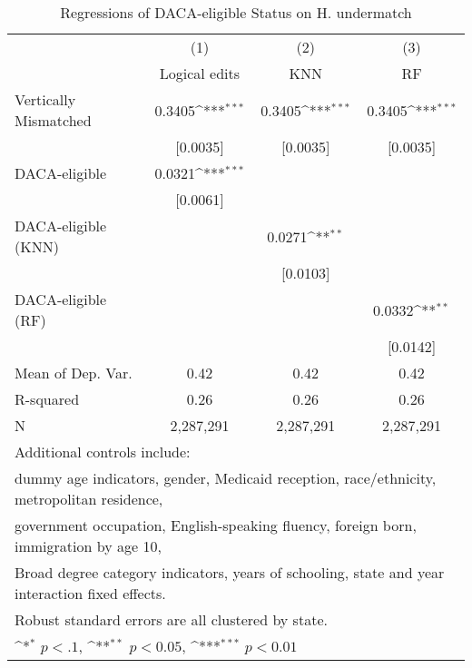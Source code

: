 \begin{table}[htbp]\centering
\def\sym#1{\ifmmode^{#1}\else\(^{#1}\)\fi}
\caption{Regressions of DACA-eligible Status on H. undermatch}
\begin{tabular}{l*{3}{c}}
\toprule
                    &\multicolumn{1}{c}{(1)}         &\multicolumn{1}{c}{(2)}         &\multicolumn{1}{c}{(3)}         \\
                    &Logical edits         &         KNN         &          RF         \\
\midrule
Vertically Mismatched&      0.3405\sym{***}&      0.3405\sym{***}&      0.3405\sym{***}\\
                    &    [0.0035]         &    [0.0035]         &    [0.0035]         \\
\addlinespace
DACA-eligible       &      0.0321\sym{***}&                     &                     \\
                    &    [0.0061]         &                     &                     \\
\addlinespace
DACA-eligible (KNN) &                     &      0.0271\sym{**} &                     \\
                    &                     &    [0.0103]         &                     \\
\addlinespace
DACA-eligible (RF)  &                     &                     &      0.0332\sym{**} \\
                    &                     &                     &    [0.0142]         \\
\midrule
Mean of Dep. Var.   &        0.42         &        0.42         &        0.42         \\
R-squared           &        0.26         &        0.26         &        0.26         \\
N                   &   2,287,291         &   2,287,291         &   2,287,291         \\
\bottomrule
\multicolumn{4}{l}{\footnotesize Additional controls include:}\\
\multicolumn{4}{l}{\footnotesize dummy age indicators, gender, Medicaid reception, race/ethnicity, metropolitan residence,}\\
\multicolumn{4}{l}{\footnotesize government occupation, English-speaking fluency, foreign born, immigration by age 10,}\\
\multicolumn{4}{l}{\footnotesize Broad degree category indicators, years of schooling, state and year interaction fixed effects.}\\
\multicolumn{4}{l}{\footnotesize Robust standard errors are all clustered by state.}\\
\multicolumn{4}{l}{\footnotesize \sym{*} \(p<.1\), \sym{**} \(p<0.05\), \sym{***} \(p<0.01\)}\\
\end{tabular}
\end{table}
